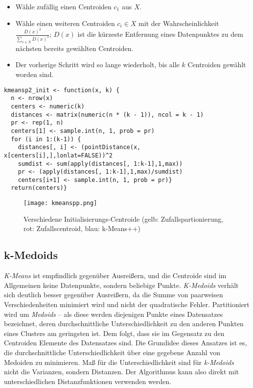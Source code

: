 \documentclass[a4paper,12pt,twoside]{article}
\newcommand{\Fachbegriff}[1]{\textit{#1}}
\begin{document}
\begin{itemize}
\item Wähle zufällig einen Centroiden $c_1$ aus $X$. 
\item Wähle einen weiteren Centroiden $c_i \in X$ mit der Wahrscheinlichkeit $\frac{D(x)^2}{\sum_{x \in X} {D(x)^2}}$; $D(x)$ ist die kürzeste Entfernung eines Datenpunktes zu dem nächsten bereits gewählten Centroiden.
\item Der vorherige Schritt wird so lange wiederholt, bis alle $k$ Centroiden gewählt worden sind.
\end{itemize}

\begin{minipage}{\linewidth}
\begin{lstlisting}[caption={Initialisierung k-Means++ in R}, label=list:kmeansp2] 
kmeansp2_init <- function(x, k) {
  n <- nrow(x)
  centers <- numeric(k)
  distances <- matrix(numeric(n * (k - 1)), ncol = k - 1)
  pr <- rep(1, n)
  centers[1] <- sample.int(n, 1, prob = pr)
  for (i in 1:(k-1)) {
    distances[, i] <- (pointDistance(x, x[centers[i],],lonlat=FALSE))^2
    sumdist <- sum(apply(distances[, 1:k-1],1,max))
    pr <- (apply(distances[, 1:k-1],1,max)/sumdist)
    centers[i+1] <- sample.int(n, 1, prob = pr)}
  return(centers)}
\end{lstlisting}
\end{minipage}

\begin{figure}
	\centering
	\texttt{[image: kmeanspp.png]}
	\caption{Verschiedene Initialisierungs-Centroide (gelb: Zufallspartionierung, rot: Zufallscentroid, blau: k-Means++)}
	\label{img:kmeanspp}
\end{figure}

\subsection{k-Medoids}
\Fachbegriff {K-Means} ist empfindlich gegenüber Ausreißern, und die Centroide sind im Allgemeinen keine Datenpunkte, sondern beliebige Punkte. \Fachbegriff {K-Medoids} verhält sich deutlich besser gegenüber Ausreißern, da die Summe von paarweisen Verschiedenheiten minimiert wird und nicht der quadratische Fehler. Partitioniert wird um \Fachbegriff {Medoids} -- als diese werden diejenigen Punkte eines Datensatzes bezeichnet, deren durchschnittliche Unterschiedlichkeit zu den anderen Punkten eines Clusters am geringsten ist. Dem folgt, dass sie im Gegensatz zu den Centroiden Elemente des Datensatzes sind. Die Grundidee dieses Ansatzes ist es, die durchschnittliche Unterschiedlichkeit über eine gegebene Anzahl von Medoiden zu minimieren. Maß für die Unterschiedlichkeit sind für \Fachbegriff {k-Medoids} nicht die Varianzen, sondern Distanzen. Der Algorithmus kann also direkt mit unterschiedlichen Distanzfunktionen verwenden werden. \autocite{Kaufman.2009}
\end{document}
